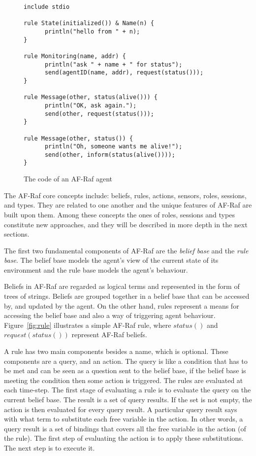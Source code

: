 \documentclass[a4paper,12pt,oneside,fleqn]{book} %
\begin{document}
\begin{figure}\footnotesize %
\begin{verbatim}
include stdio

rule State(initialized()) & Name(n) {
      println("hello from " + n);
}

rule Monitoring(name, addr) {
      println("ask " + name + " for status");
      send(agentID(name, addr), request(status()));
}

rule Message(other, status(alive())) {
      println("OK, ask again.");
      send(other, request(status()));
}

rule Message(other, status()) {
      println("Oh, someone wants me alive!");
      send(other, inform(status(alive())));
}
\end{verbatim}
\caption{The code of an AF-Raf agent}
\label{fig:AF-Raf}
\end{figure} %

The AF-Raf core concepts include: beliefs, rules, actions, sensors, roles,
sessions, and types. They are related to one another and the unique
features of AF-Raf are built upon them. Among these concepts the ones of
roles, sessions and types constitute new approaches, and they will be
described in more depth in the next sections. 

The first two fundamental components of AF-Raf are the \textit{belief base}
and the \textit{rule base}. The belief base models the agent's view of the
current state of its environment and the rule base models the agent's
behaviour.

Beliefs in AF-Raf are regarded as logical terms and represented in the form
of trees of strings. Beliefs are grouped together in a belief base that can
be accessed by, and updated by the agent. On the other hand, rules
represent a means for accessing the belief base and also a way of
triggering agent behaviour. Figure~\ref{fig:rule} illustrates a simple
AF-Raf rule, where $status()$ and $request(status())$ represent AF-Raf
beliefs. 

A rule has two main components besides a name, which is optional. These
components are a query, and an action. The query is like a condition that
has to be met and can be seen as a question sent to the belief base, if the
belief base is meeting the condition then some action is triggered. The
rules are evaluated at each time-step. The first stage of evaluating a rule
is to evaluate the query on the current belief base. The result is a set of
query results. If the set is not empty, the action is then evaluated for
every query result. A particular query result says with what term to
substitute each free variable in the action. In other words, a query result
is a set of bindings that covers all the free variable in the action (of
the rule). The first step of evaluating the action is to apply these
substitutions. The next step is to execute it.
\end{document}
